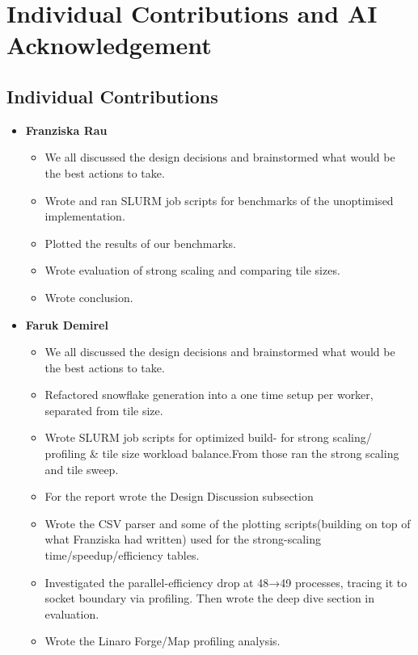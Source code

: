 \chapter{Individual Contributions and AI Acknowledgement}

\section{Individual Contributions}

\begin{itemize}
    \item \textbf{Franziska Rau}
    \begin{itemize}
         \item We all discussed the design decisions and brainstormed what would be the best actions to take.
         \item Wrote and ran SLURM job scripts for benchmarks of the unoptimised implementation.
         \item Plotted the results of our benchmarks.
         \item Wrote evaluation of strong scaling and comparing tile sizes.
         \item Wrote conclusion.
    \end{itemize}
    \item \textbf{Faruk Demirel}
    \begin{itemize}
        \item We all discussed the design decisions and brainstormed what would be the best actions to take.
        \item Refactored snowflake generation into a one time setup per worker, separated from tile size.
        \item Wrote SLURM job scripts for optimized build- for strong scaling/ profiling \& tile size workload balance.From those ran the strong scaling and tile sweep.
        \item For the report wrote the Design Discussion subsection
        \item Wrote the CSV parser and some of the plotting scripts(building on top of what Franziska had written) used for the strong-scaling time/speedup/efficiency tables. 
        \item Investigated the parallel-efficiency drop at 48→49 processes, tracing it to socket boundary via profiling. Then wrote the deep dive section in evaluation.
        \item Wrote the Linaro Forge/Map profiling analysis.
        \end{itemize}

\end{itemize}
